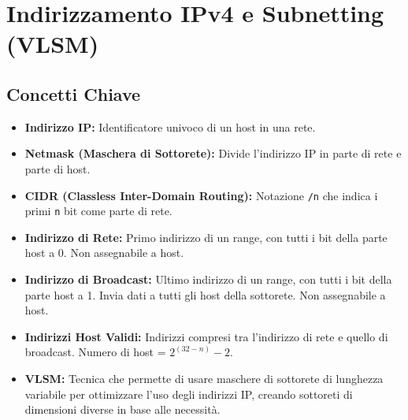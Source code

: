 \section{Indirizzamento IPv4 e Subnetting (VLSM)} %
\label{sec:ipv4-subnetting} %

\subsection{Concetti Chiave}
\begin{itemize} %
    \item \textbf{Indirizzo IP:} Identificatore univoco di un host in una rete.
    \item \textbf{Netmask (Maschera di Sottorete):} Divide l'indirizzo IP in parte di rete e parte di host.
    \item \textbf{CIDR (Classless Inter-Domain Routing):} Notazione \texttt{/n} che indica i primi \texttt{n} bit come parte di rete.
    \item \textbf{Indirizzo di Rete:} Primo indirizzo di un range, con tutti i bit della parte host a 0. Non assegnabile a host.
    \item \textbf{Indirizzo di Broadcast:} Ultimo indirizzo di un range, con tutti i bit della parte host a 1. Invia dati a tutti gli host della sottorete. Non assegnabile a host.
    \item \textbf{Indirizzi Host Validi:} Indirizzi compresi tra l'indirizzo di rete e quello di broadcast. Numero di host = $2^{(32-n)} - 2$.
    \item \textbf{VLSM:} Tecnica che permette di usare maschere di sottorete di lunghezza variabile per ottimizzare l'uso degli indirizzi IP, creando sottoreti di dimensioni diverse in base alle necessità.
\end{itemize}

